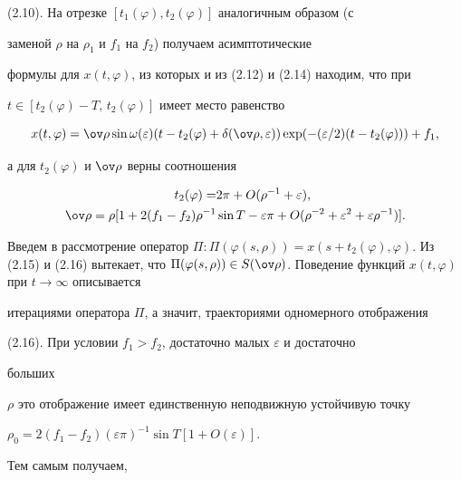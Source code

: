 (2.10). На отрезке $[t_1(\varphi), t_2(\varphi)]$ аналогичным образом (с


заменой $\rho$ на $\rho_1$ и $f_1$ на $f_2$) получаем асимптотические


формулы для $x(t,\varphi)$, из которых и из (2.12) и (2.14) находим, что при


$t\in[t_2(\varphi)-T,\,t_2(\varphi)]$ имеет место равенство


\begin{equation}


x(t,\varphi) =


\ov\rho\sin\omega(\varepsilon)(t-t_2(\varphi)+\delta(\ov\rho,\varepsilon))


\exp(-(\varepsilon/2)(t-t_2(\varphi))) + f_1,


\end{equation}


а для $t_2(\varphi)$ и $\ov\rho$ верны соотношения


\begin{equation}


\begin{split}


t_2(\varphi) = &2\pi+O(\rho^{-1}+\varepsilon),\\


\ov\rho=\rho[1+2(f_1-f_2)\rho^{-1}&\sin T-\varepsilon\pi+O(\rho^{-2}+


\varepsilon^2 + \varepsilon\rho^{-1})].


\end{split}


\end{equation}


Введем в рассмотрение оператор $\Pi:\Pi(\varphi(s,\rho))=x(s+t_2(\varphi),


\varphi)$. Из (2.15) и (2.16) вытекает, что $\Pi(\varphi(s,\rho))\in


S(\ov\rho)$. Поведение функций $x(t,\varphi)$ при $t\to\infty$ описывается


итерациями оператора $\Pi$, а значит, траекториями одномерного отображения


(2.16). При условии $f_1>f_2$, достаточно малых $\varepsilon$ и достаточно


больших


$\rho$ это отображение имеет единственную неподвижную устойчивую точку


$\rho_0=2(f_1-f_2)(\varepsilon\pi)^{-1}\sin T [1+O(\varepsilon)]$.


Тем самым получаем,


